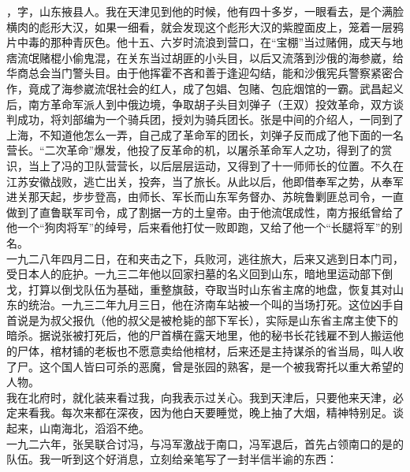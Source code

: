 ，字，山东掖县人。我在天津见到他的时候，他有四十多岁，一眼看去，是个满脸横肉的彪形大汉，如果一细看，就会发现这个彪形大汉的紫膛面皮上，笼着一层鸦片中毒的那种青灰色。他十五、六岁时流浪到营口，在“宝棚”当过赌佣，成天与地痞流氓赌棍小偷鬼混，在关东当过胡匪的小头目，以后又流落到沙俄的海参崴，给华商总会当门警头目。由于他挥霍不吝和善于逢迎勾结，能和沙俄宪兵警察紧密合作，竟成了海参崴流氓社会的红人，成了包娼、包赌、包庇烟馆的一霸。武昌起义后，南方革命军派人到中俄边境，争取胡子头目刘弹子（王双）投效革命，双方谈判成功，将刘部编为一个骑兵团，授刘为骑兵团长。张是中间的介绍人，一同到了上海，不知道他怎么一弄，自己成了革命军的团长，刘弹子反而成了他下面的一名营长。“二次革命”爆发，他投了反革命的机，以屠杀革命军人之功，得到了的赏识，当上了冯的卫队营营长，以后层层运动，又得到了十一师师长的位置。不久在江苏安徽战败，逃亡出关，投奔，当了旅长。从此以后，他即借奉军之势，从奉军进关那天起，步步登高，由师长、军长而山东军务督办、苏皖鲁剿匪总司令，一直做到了直鲁联军司令，成了割据一方的土皇帝。由于他流氓成性，南方报纸曾给了他一个“狗肉将军”的绰号，后来看他打仗一败即跑，又给了他一个“长腿将军”的别名。\\

一九二八年四月二日，在和夹击之下，兵败河，逃往旅大，后来又逃到日本门司，受日本人的庇护。一九三二年他以回家扫墓的名义回到山东，暗地里运动部下倒戈，打算以倒戈队伍为基础，重整旗鼓，夺取当时山东省主席的地盘，恢复其对山东的统治。一九三二年九月三日，他在济南车站被一个叫的当场打死。这位凶手自首说是为叔父报仇（他的叔父是被枪毙的部下军长），实际是山东省主席主使下的暗杀。据说张被打死后，他的尸首横在露天地里，他的秘书长花钱雇不到人搬运他的尸体，棺材铺的老板也不愿意卖给他棺材，后来还是主持谋杀的省当局，叫人收了尸。这个国人皆曰可杀的恶魔，曾是张园的熟客，是一个被我寄托以重大希望的人物。\\

我在北府时，就化装来看过我，向我表示过关心。我到天津后，只要他来天津，必定来看我。每次来都在深夜，因为他白天要睡觉，晚上抽了大烟，精神特别足。谈起来，山南海北，滔滔不绝。\\

一九二六年，张吴联合讨冯，与冯军激战于南口，冯军退后，首先占领南口的是的队伍。我一听到这个好消息，立刻给亲笔写了一封半信半谕的东西：\\

